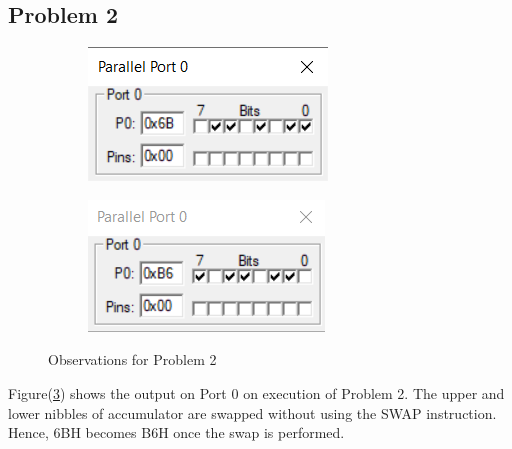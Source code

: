\documentclass{lab_sheet}
\begin{document}
\subsection*{Problem 2}
\begin{figure}[H]
\begin{subfigure}{.5\textwidth}
  \centering
  \includegraphics[frame,width=.8\linewidth]{../Figures/1_2_a.png}  
  \label{fig:prob2-a}
  \caption{}
\end{subfigure}
\begin{subfigure}{.5\textwidth}
  \centering
  \includegraphics[frame,width=.8\linewidth]{../Figures/1_2_b.png}  
  \label{fig:prob2-b}
  \caption{}
\end{subfigure}
\caption{Observations for Problem 2}
\label{fig:prob2}
\end{figure}
Figure(\ref{fig:prob2}) shows the output on Port 0 on execution of Problem 2. The upper and lower nibbles of accumulator are swapped without using the SWAP instruction. Hence, 6BH becomes B6H once the swap is performed.
\end{document}
